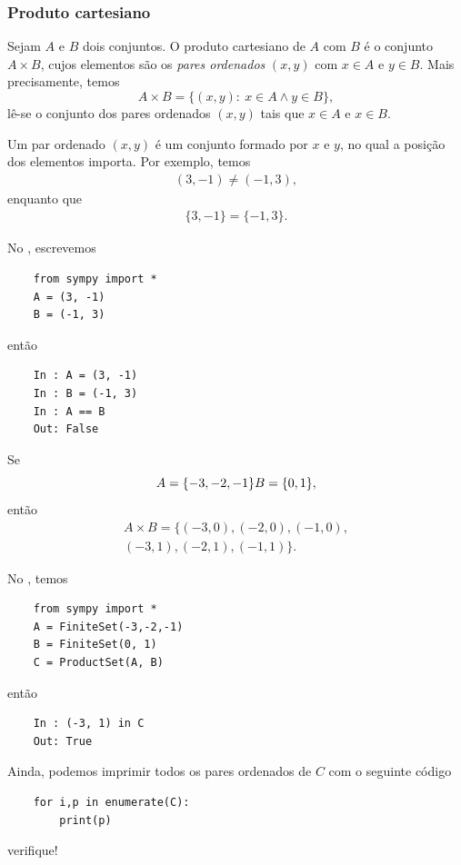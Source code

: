 \subsubsection{Produto cartesiano}

Sejam $A$ e $B$ dois conjuntos. O produto cartesiano de $A$ com $B$ é o conjunto $A\times B$, cujos elementos são os \emph{pares ordenados} $(x, y)$ com $x\in A$ e $y\in B$. Mais precisamente, temos
\begin{equation}
  A\times B = \{(x, y):~x\in A \land y\in B\},
\end{equation}
lê-se o conjunto dos pares ordenados $(x, y)$ tais que $x\in A$ e $x\in B$.

\begin{obs}
  Um par ordenado $(x, y)$ é um conjunto formado por $x$ e $y$, no qual a posição dos elementos importa. Por exemplo, temos
  \begin{gather}
    (3, -1) \neq (-1, 3),
  \end{gather}
  enquanto que
  \begin{gather}
    \{3, -1\} = \{-1, 3\}.
  \end{gather}

  \ifispython
  No \python, escrevemos
  \begin{lstlisting}
    from sympy import *
    A = (3, -1)
    B = (-1, 3)
  \end{lstlisting}
  então
  \begin{lstlisting}
    In : A = (3, -1)
    In : B = (-1, 3)
    In : A == B
    Out: False
  \end{lstlisting}
  \fi
\end{obs}

\begin{ex}
  Se
  \begin{equation}
    A = \{-3, -2, -1\}\\
    B = \{0, 1\},
  \end{equation}
  então
  \begin{gather}
    A\times B = \{(-3,0), (-2, 0), (-1, 0), \\
    (-3, 1), (-2, 1), (-1, 1)\}.
  \end{gather}

  \ifispython
  No \python, temos
  \begin{lstlisting}
    from sympy import *
    A = FiniteSet(-3,-2,-1)
    B = FiniteSet(0, 1)
    C = ProductSet(A, B)
  \end{lstlisting}
  então
  \begin{lstlisting}
    In : (-3, 1) in C 
    Out: True
  \end{lstlisting}
  Ainda, podemos imprimir todos os pares ordenados de $C$ com o seguinte código
  \begin{lstlisting}
    for i,p in enumerate(C):
        print(p)
  \end{lstlisting}
  verifique!    
  \fi
\end{ex}

